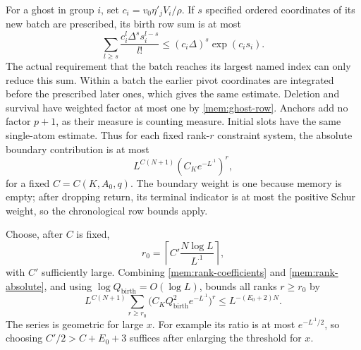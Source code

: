 For a ghost in group $i$, set
$c_i=v_0\eta'_jV_i/\rho$. If $s$ specified ordered coordinates of
its new batch are prescribed, its birth row sum is at most
\begin{equation}\label{mem:ghost-atoms}
 \sum_{l\ge s}\frac{c_i^l\Delta^s s_i^{l-s}}{l!}
 \le(c_i\Delta)^s\exp(c_i s_i).
\end{equation}
The actual requirement that the batch reaches its largest named
index can only reduce this sum. Within a batch the earlier pivot
coordinates are integrated before the prescribed later ones, which
gives the same estimate. Deletion and survival have weighted factor
at most one by \eqref{mem:ghost-row}. Anchors add no factor $p+1$,
as their measure is counting measure. Initial slots have the same
single-atom estimate. Thus for each fixed rank-$r$ constraint system,
the absolute boundary contribution is at most
\begin{equation}\label{mem:rank-absolute}
 L^{C(N+1)}(C_K e^{-L^{.1}})^r,
\end{equation}
for a fixed $C=C(K,A_0,q)$. The boundary weight is one because memory
is empty; after dropping return, its terminal indicator is at most
the positive Schur weight, so the chronological row bounds apply.

Choose, after $C$ is fixed,
\begin{equation}\label{mem:rank-cutoff}
 r_0=\left\lceil C'\frac{N\log L}{L^{.1}}\right\rceil,
\end{equation}
with $C'$ sufficiently large. Combining
\eqref{mem:rank-coefficients} and \eqref{mem:rank-absolute}, and using
$\log Q_{\mathrm{birth}}=O(\log L)$, bounds all ranks $r\ge r_0$ by
\begin{equation}\label{mem:high-rank}
 L^{C(N+1)}\sum_{r\ge r_0}
   \bigl(C_K Q_{\mathrm{birth}}^2e^{-L^{.1}}\bigr)^r
 \le L^{-(E_0+2)N}.
\end{equation}
The series is geometric for large $x$. For example its ratio is at
most $e^{-L^{.1}/2}$, so choosing $C'/2>C+E_0+3$ suffices after
enlarging the threshold for $x$.


